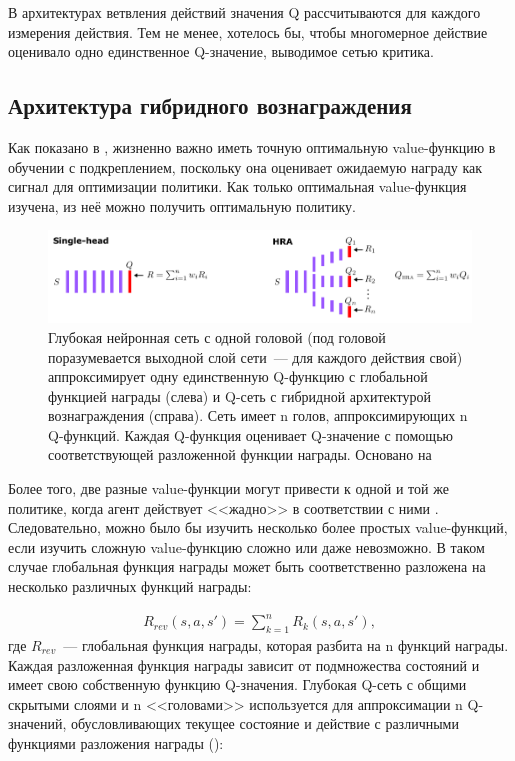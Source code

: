 В архитектурах ветвления действий значения Q рассчитываются для каждого измерения действия. Тем не менее, хотелось бы, чтобы многомерное действие оценивало одно единственное Q-значение, выводимое сетью критика.

\subsection{Архитектура гибридного вознаграждения}

Как показано в \cite{seijen2017hybrid}, жизненно важно иметь точную оптимальную value-функцию в обучении с подкреплением, поскольку она оценивает ожидаемую награду как сигнал для оптимизации политики. Как только оптимальная value-функция изучена, из неё можно получить оптимальную политику.

\begin{figure}[ht!]
    \center
    \includegraphics [scale=0.80] {my_folder/images/ch2/hybrid-reward.png}
    \caption{Глубокая нейронная сеть с одной головой (под головой поразумевается выходной слой сети~--- для каждого действия свой) аппроксимирует одну единственную Q-функцию с глобальной функцией награды (слева) и Q-сеть с гибридной архитектурой вознаграждения (справа). Сеть имеет n голов, аппроксимирующих n Q-функций. Каждая Q-функция оценивает Q-значение с помощью соответствующей разложенной функции награды. Основано на \cite{seijen2017hybrid}}
    \label{fig:ch2-hybrid-reward}
\end{figure}

Более того, две разные value-функции могут привести к одной и той же политике, когда агент действует <<жадно>> в соответствии с ними \cite{seijen2017hybrid}. Следовательно, можно было бы изучить несколько более простых value-функций, если изучить сложную value-функцию сложно или даже невозможно. В таком случае глобальная функция награды может быть соответственно разложена на несколько различных функций награды:

\begin{equation}
    \begin{multlined}
        R_{rev}(s, a, s') = \sum^n_{k=1} R_k (s, a, s'),
    \end{multlined}
\end{equation}
где $R_{rev}$~--- глобальная функция награды, которая разбита на n функций награды. Каждая разложенная функция награды зависит от подмножества состояний и имеет свою собственную функцию Q-значения. Глубокая Q-сеть с общими скрытыми слоями и n <<головами>> используется для аппроксимации n Q-значений, обусловливающих текущее состояние и действие с различными функциями разложения награды ():

